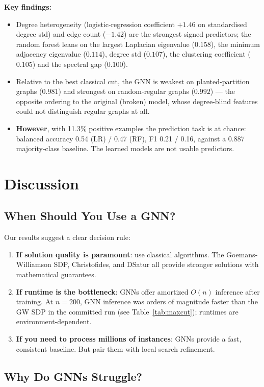 \documentclass[11pt]{article}
\begin{document}
\textbf{Key findings:}
\begin{itemize}
    \item Degree heterogeneity (logistic-regression coefficient $+1.46$ on standardised degree std) and edge count ($-1.42$) are the strongest signed predictors; the random forest leans on the largest Laplacian eigenvalue ($0.158$), the minimum adjacency eigenvalue ($0.114$), degree std ($0.107$), the clustering coefficient ($0.105$) and the spectral gap ($0.100$).
    \item Relative to the best classical cut, the GNN is weakest on planted-partition graphs ($0.981$) and strongest on random-regular graphs ($0.992$) --- the opposite ordering to the original (broken) model, whose degree-blind features could not distinguish regular graphs at all.
    \item \textbf{However}, with 11.3\% positive examples the prediction task is at chance: balanced accuracy 0.54 (LR) / 0.47 (RF), F1 0.21 / 0.16, against a 0.887 majority-class baseline. The learned models are not usable predictors.
\end{itemize}

\section{Discussion}

\subsection{When Should You Use a GNN?}

Our results suggest a clear decision rule:
\begin{enumerate}
    \item \textbf{If solution quality is paramount}: use classical algorithms. The Goemans-Williamson SDP, Christofides, and DSatur all provide stronger solutions with mathematical guarantees.
    \item \textbf{If runtime is the bottleneck}: GNNs offer amortized $O(n)$ inference after training. At $n = 200$, GNN inference was orders of magnitude faster than the GW SDP in the committed run (see Table~\ref{tab:maxcut}); runtimes are environment-dependent.
    \item \textbf{If you need to process millions of instances}: GNNs provide a fast, consistent baseline. But pair them with local search refinement.
\end{enumerate}

\subsection{Why Do GNNs Struggle?}
\end{document}
